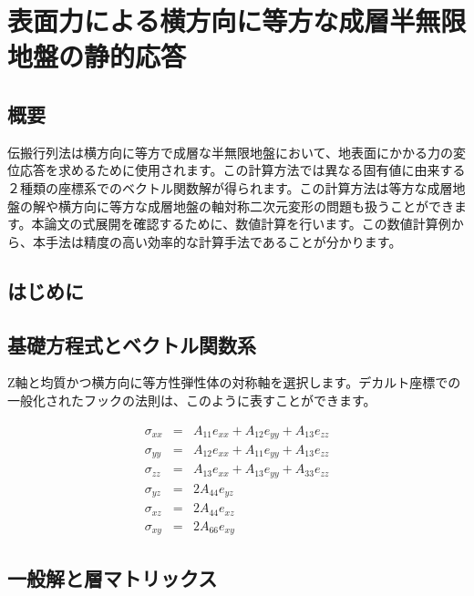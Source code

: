 \section{表面力による横方向に等方な成層半無限地盤の静的応答}

\subsection*{概要}

伝搬行列法は横方向に等方で成層な半無限地盤において、地表面にかかる力の変位応答を求めるために使用されます。この計算方法では異なる固有値に由来する２種類の座標系でのベクトル関数解が得られます。この計算方法は等方な成層地盤の解や横方向に等方な成層地盤の軸対称二次元変形の問題も扱うことができます。本論文の式展開を確認するために、数値計算を行います。この数値計算例から、本手法は精度の高い効率的な計算手法であることが分かります。

\subsection{はじめに}

\subsection{基礎方程式とベクトル関数系}

Z軸と均質かつ横方向に等方性弾性体の対称軸を選択します。デカルト座標での一般化されたフックの法則は、このように表すことができます。

\[\begin{aligned}
\sigma_{xx} & = & A_{11}e_{xx}+A_{12}e_{yy}+A_{13}e_{zz}\\
\sigma_{yy} & = & A_{12}e_{xx}+A_{11}e_{yy}+A_{13}e_{zz}\\
\sigma_{zz} & = & A_{13}e_{xx}+A_{13}e_{yy}+A_{33}e_{zz}\\
\sigma_{yz} & = & 2A_{44}e_{yz}\\
\sigma_{xz} & = & 2A_{44}e_{xz}\\
\sigma_{xy} & = & 2A_{66}e_{xy}\end{aligned}\]

\subsection{一般解と層マトリックス}

